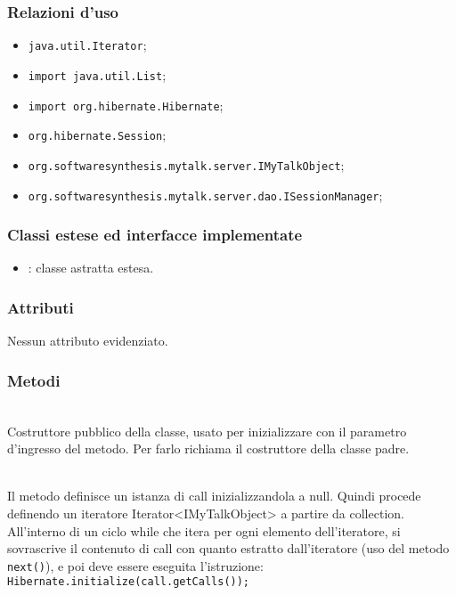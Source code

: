 \subsubsection*{Relazioni d'uso}

\begin{itemize}
		\item \texttt{java.util.Iterator};
		\item \texttt{import java.util.List};
		\item \texttt{import org.hibernate.Hibernate};
		\item \texttt{org.hibernate.Session};
		\item \texttt{org.softwaresynthesis.mytalk.server.IMyTalkObject};
		\item \texttt{org.softwaresynthesis.mytalk.server.dao.ISessionManager};
\end{itemize}

\subsubsection*{Classi estese ed interfacce implementate}

\begin{itemize}
	\item {}: classe astratta estesa.
\end{itemize}

\subsubsection*{Attributi}

Nessun attributo evidenziato.

\subsubsection*{Metodi}

\begin{description}
	\item{}\\
	Costruttore pubblico della classe, usato per inizializzare  con il parametro d'ingresso del metodo. Per farlo richiama il costruttore della classe padre.

	\item{}\\
	Il metodo definisce un istanza di  call inizializzandola a null. Quindi procede definendo un iteratore Iterator<IMyTalkObject> a partire da collection. All'interno di un ciclo while che itera per ogni elemento dell'iteratore, si sovrascrive il contenuto di call con quanto estratto dall'iteratore (uso del metodo \texttt{next()}), e poi deve essere eseguita l'istruzione:\\
	
	\verb|Hibernate.initialize(call.getCalls());|

\end{description}


